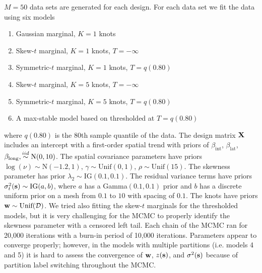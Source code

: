 \documentclass[useAMS,usenatbib,referee]{biom}
\begin{document}


$M = 50$ data sets are generated for each design.
For each data set we fit the data using six models
\begin{enumerate}[leftmargin=3em]
  \item Gaussian marginal, $K=1$ knots
  \item Skew-$t$ marginal, $K=1$ knots, $T=-\infty$
  \item Symmetric-$t$ marginal, $K=1$ knots, $T=q(0.80)$
  \item Skew-$t$ marginal, $K=5$ knots, $T=-\infty$
  \item Symmetric-$t$ marginal, $K=5$ knots, $T=q(0.80)$
  \item A max-stable model based on \citet{Reich2012} thresholded at $T = q(0.80)$
\end{enumerate}
where $q(0.80)$ is the 80th sample quantile of the data.
The design matrix $\mbox{\bf X}$ includes an intercept with a first-order spatial trend with priors of $\beta_\text{int}$, $\beta_\text{lat}$, $\beta_\text{long},  \stackrel{iid}{\sim} \text{N}(0, 10)$.
The spatial covariance parameters have priors $\log(\nu) \sim \text{N}(-1.2, 1)$, $\gamma \sim \text{Unif}(0, 1)$, $\rho \sim \text{Unif}(15)$.
The skewness parameter has prior $\lambda_2 \sim \text{IG}(0.1, 0.1)$.
The residual variance terms have priors $\sigma^2_t(\mbox{\bf s}) \sim \text{IG}(a, b)$, where $a$ has a Gamma$(0.1, 0.1)$ prior and $b$ has a discrete uniform prior on a mesh from $0.1$ to $10$ with spacing of $0.1$.
The knots have priors $\bw \sim \text{Unif}(\calD)$.
We tried also fitting the skew-$t$ marginals for the thresholded models, but it is very challenging for the MCMC to properly identify the skewness parameter with a censored left tail.
Each chain of the MCMC ran for 20,000 iterations with a burn-in period of 10,000 iterations.
Parameters appear to converge properly; however, in the models with multiple partitions (i.e. models 4 and 5) it is hard to assess the convergence of $\mbox{\bf w}$, $z(\mbox{\bf s})$, and $\sigma^2(\mbox{\bf s})$ because of partition label switching throughout the MCMC.
\end{document}
